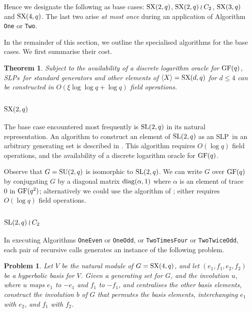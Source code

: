 \documentclass[12pt]{article}
\newtheorem{theorem}[definition]{Theorem}
\newtheorem{problem}[definition]{Problem}
\def\SL{{\rm SL}}
\def\Oh{O}  %
\def\GF{{\rm GF}}
\def\SU{{\rm SU}}
\def\SX{{\rm SX}}
\def\SLP{{\rm SLP}}
\def\SLPs{{\rm SLPs}}
\begin{document}
Hence we designate the following as 
base cases: $\SX(2, q)$, $\SX(2, q) \wr C_2$, $\SX(3, q)$ and $\SX(4, q)$. 
The last two arise {\it at most once} during
an application of Algorithm {\tt One} or {\tt Two}.

In the remainder of this section, 
we outline the specialised algorithms
for the base cases. 
We first summarise their cost.

\begin{theorem}\label{ryba-alg}
Subject to the availability of a discrete logarithm oracle for $\GF(q)$,
\SLPs\ for standard generators and other 
elements of $\langle X \rangle = \SX(d, q)$ for $d \leq 4$ can be 
constructed in $\Oh(\xi \log \log q + \log q)$ field operations.
\end{theorem}

\subsection{$\SX(2,q)$}
The base case encountered most frequently is $\SL(2,q)$
in its natural representation.
An algorithm to construct an element of $\SL(2,q)$ as an \SLP\ 
in an arbitrary generating set is described in \cite{Conderetal05}. 
This algorithm requires $\Oh(\log q)$ field operations, and the 
availability of a discrete logarithm oracle for $\GF(q)$.

Observe that $G=\SU(2, q)$ is isomorphic to $\SL(2, q)$.
We can write $G$ over $\GF(q)$  by conjugating 
$G$ by a diagonal matrix $\rm{diag}(\alpha, 1)$
where $\alpha$ is an element of trace 0 in $\GF(q^2)$;
alternatively we could use the algorithm 
of \cite{GLO}; either requires $\Oh(\log q)$ field operations.

\subsection{$\SL(2, q) \wr C_2$}\label{glue-element}
In executing Algorithms {\tt OneEven} or {\tt OneOdd}, or
{\tt TwoTimesFour} or {\tt TwoTwiceOdd}, 
each pair of recursive calls generates
an instance of the following problem.

\begin{problem} \label{glue}
Let $V$ be the natural module of  $G=\SX(4,q)$, and let
$(e_1,f_1,e_2,f_2)$ be a hyperbolic basis for $V$. Given a generating
set for $G$, and the involution $u$, where $u$ maps $e_1$ to $-e_1$
and $f_1$ to $-f_1$, and centralises the other basis
elements, construct the involution $b$ of $G$ that permutes the basis
elements, interchanging $e_1$ with $e_2$, and $f_1$ with $f_2$.
\end{problem}
\end{document}
